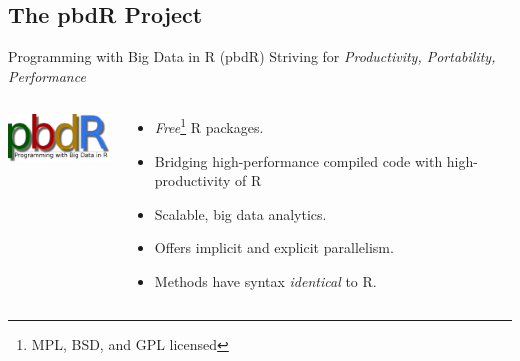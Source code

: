 \subsection{The pbdR Project}


\begin{frame}
  \begin{block}{Programming with Big Data in R (pbdR)}
       \centering Striving for \emph{Productivity, Portability, Performance}\\[.4cm]\pause
  \begin{columns}[onlytextwidth]
    \begin{column}{0.30\textwidth}
      \centering
       \includegraphics[width=3.4cm]{../common/pics/simple}\\[.2cm]
    \end{column}
    \begin{column}{0.65\textwidth}
  \begin{itemize}[<+-|alert@+>]
    \item \emph{Free}\footnote{MPL, BSD, and GPL licensed} R packages.
    \item Bridging high-performance compiled code with high-productivity of R
    \item Scalable, big data analytics.
    \item Offers implicit and explicit parallelism.
    \item Methods have syntax \emph{identical} to R.
  \end{itemize}
    \end{column}
​  \end{columns}
\end{block}
\end{frame}




